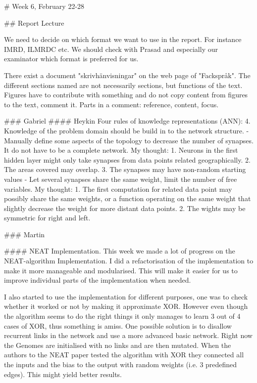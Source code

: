 # Week 6, February 22-28

## Report Lecture

We need to decide on which format we want to use in the report. For instance IMRD, ILMRDC etc. We should check with Prasad and especially our examinator which format is preferred for us. 

There exist a document "skrivhänvisningar" on the web page of "Fackspråk". The different sections named are not necessarily sections, but functions of the text. Figures have to contribute with something and do not copy content from figures to the text, comment it. Parts in a comment: reference, content, focus.



### Gabriel
#### Heykin
Four rules of knowledge representations (ANN):
4. Knowledge of the problem domain should be build in to the network structure.
  - Manually define some aspects of the topology to decrease the number of synapses. It do not have to be a complete network. My thought: 1. Neurons in the first hidden layer might only take synapses from data points related geographically. 2. The areas covered may overlap. 3. The synapses may have non-random starting values
  - Let several synapses share the same weight, limit the number of free variables. My thought: 1. The first computation for related data point may possibly share the same weights, or a function operating on the same weight that slightly decrease the weight for more distant data points. 2. The wights may be symmetric for right and left. 
  
  
### Martin

#### NEAT Implementation.
This week we made a lot of progress on the NEAT-algorithm Implementation. I did a refactorisation of the implementation to make it more manageable and modularised. This will make it easier for us to improve individual parts of the implementation when needed. 

I also started to use the implementation for different purposes, one was to check whether it worked or not by making it approximate XOR. However even though the algorithm seems to do the right things it only manages to learn 3 out of 4 cases of XOR, thus something is amiss. One possible solution is to disallow recurrent links in the network and use a more advanced basic network. Right now the Genomes are initialised with no links and are then mutated. When the authors to the NEAT paper tested the algorithm with XOR they connected all the inputs and the bias to the output with random weights (i.e. 3 predefined edges). This might yield better results. 

